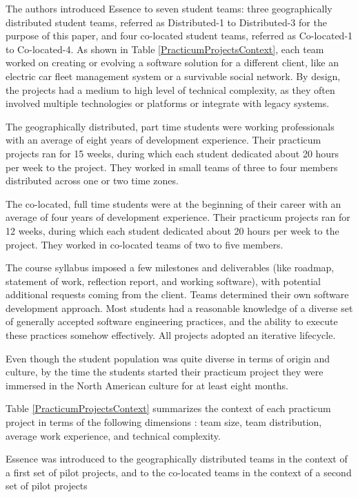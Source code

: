The authors introduced Essence to seven student teams: three geographically distributed student teams, referred as Distributed-1 to Distributed-3 for the purpose of this paper, and four co-located student teams, referred as Co-located-1 to Co-located-4. As shown in Table \ref{PracticumProjectsContext}, each team worked on creating or evolving a software solution for a different client, like an electric car fleet management system or a survivable social network. By design, the projects had a medium to high level of technical complexity, as they often involved multiple technologies or platforms or integrate with legacy systems.

The geographically distributed, part time students were working professionals with an average of eight years of development experience. Their practicum projects ran for 15 weeks, during which each student dedicated about 20 hours per week to the project. They worked in small teams of three to four members distributed across one or two time zones.

The co-located, full time students were at the beginning of their career with an average of four years of development experience. Their practicum projects ran for 12 weeks, during which each student dedicated about 20 hours per week to the project. They worked in co-located teams of two to five members.

The course syllabus imposed a few milestones and deliverables (like roadmap, statement of work, reflection report, and working software), with potential additional requests coming from the client. Teams determined their own software development approach. Most students had a reasonable knowledge of a diverse set of generally accepted software engineering practices, and the ability to execute these practices somehow effectively. All projects adopted an iterative lifecycle.

Even though the student population was quite diverse in terms of origin and culture, by the time the students started their practicum project they were immersed in the North American culture for at least eight months.

Table \ref{PracticumProjectsContext} summarizes the context of each practicum project in terms of the following dimensions \cite{AmblerDAD, BoehmBalancingAgilityAndDiscipline, KruchtenContextualizingAgile}: team size, team distribution, average work experience, and technical complexity.

Essence was introduced to the geographically distributed teams in the context of a first set of pilot projects, and to the co-located teams in the context of a second set of pilot projects

